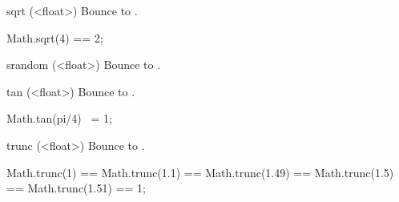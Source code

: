 \begin{urbiscriptapi}
\item[sqrt](<float>)%
  Bounce to .
\begin{urbiassert}
Math.sqrt(4) == 2;
\end{urbiassert}

\item[srandom](<float>)%
  Bounce to .

\item[tan](<float>)%
  Bounce to .
\begin{urbiassert}
Math.tan(pi/4) ~= 1;
\end{urbiassert}

\item[trunc](<float>)%
  Bounce to .
\begin{urbiassert}
Math.trunc(1) == Math.trunc(1.1) == Math.trunc(1.49) == Math.trunc(1.5)
  == Math.trunc(1.51)
  == 1;
\end{urbiassert}
\end{urbiscriptapi}


